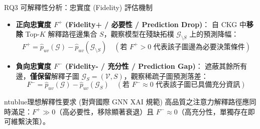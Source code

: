 \documentclass[aspectratio=169, 10pt]{beamer}
\begin{document}
\begin{frame}{RQ3 可解釋性分析：忠實度 (Fidelity) 評估機制}
  \begin{itemize}
    \item \alert{\textbf{正向忠實度 $F^+$ (Fidelity+ / 必要性 / Prediction Drop)}}：
      自 CKG 中\textbf{移除} Top-$K$ 解釋路徑邊集合 $S$，觀察模型在殘缺拓樸 $\mathcal{G}_{\setminus S}$ 上的預測降幅：
      \[
        F^+ = \hat{p}_{uv}(\mathcal{G}) - \hat{p}_{uv}(\mathcal{G}_{\setminus S}) \quad (\text{若 } F^+ > 0 \text{ 代表該子圖邊為必要決策條件})
      \]
    \item \alert{\textbf{負向忠實度 $F^-$ (Fidelity- / 充分性 / Prediction Gap)}}：
      遮蔽其餘所有邊，\textbf{僅保留}解釋子圖 $\mathcal{G}_S = (\mathcal{V}, S)$，觀察稀疏子圖預測落差：
      \[
        F^- = \hat{p}_{uv}(\mathcal{G}) - \hat{p}_{uv}(\mathcal{G}_S) \quad (\text{若 } F^- \approx 0 \text{ 代表該子圖已具備充分資訊})
      \]
  \end{itemize}

  \vspace{0.2cm}
  \begin{mybox}{ntublue}{理想解釋性要求 (對齊國際 GNN XAI 規範)}
    高品質之注意力解釋路徑應同時滿足：$F^+ \gg 0$（高必要性，移除顯著衰退）且 $F^- \approx 0$（高充分性，單獨存在即可維繫決策）。
  \end{mybox}
\end{frame}
\end{document}
